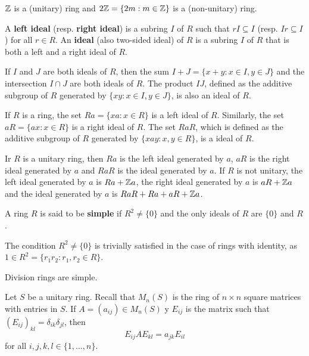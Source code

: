 \begin{example}
    $\mathbb{Z}$ is a (unitary) ring and 
	$2\mathbb{Z}=\{2m:m\in\mathbb{Z}\}$ is a (non-unitary) ring.  
\end{example}

A \textbf{left ideal} (resp. \textbf{right ideal}) is a subring $I$ of $R$ such that 
$rI\subseteq I$ (resp. $Ir\subseteq I$) for all $r\in R$. An \textbf{ideal}
(also two-sided ideal) of $R$ is a subring $I$ of $R$ that is both a left and a right ideal of $R$.

\begin{example}
	If $I$ and $J$ are both ideals of $R$, then the sum $I+J=\{x+y:x\in I,y\in J\}$ and
	the intersection $I\cap J$ are both ideals of $R$. The product $IJ$, defined as the additive
	subgroup of $R$ generated by $\{xy:x\in I,y\in J\}$, is also an ideal of $R$. 
\end{example}

\begin{example}
	If $R$ is a ring, the set $Ra =\{xa: x\in R\}$ is a left ideal
	of $R$. Similarly, the set $aR =\{ax: x\in R\}$ is a right ideal of $R$. The set $RaR$, which is
	defined as the additive subgroup of $R$ generated by $\{xay: x, y\in R\}$, is a
	ideal of $R$.
\end{example}

\begin{example}
	Ir $R$ is a unitary ring, then $Ra$ is the left ideal generated by $a$, $aR$ is
	the right ideal generated by $a$ and $RaR$ is the ideal generated by $a$. 
	If $R$ is not unitary, the left ideal generated by $a$ is $Ra+\mathbb{Z} a$,
	the right ideal generated by $a$ is $aR+\mathbb{Z} a$ and the ideal generated by 
	$a$ is $RaR+Ra+aR+\mathbb{Z} a$.
\end{example}

\begin{definition}
A ring $R$ is said to be \textbf{simple} if $R^2\ne\{0\}$ and the only ideals of 
$R$ are $\{0\}$ and $R$.  
\end{definition}

The condition $R^2\ne\{0\}$ is trivially satisfied in the case of rings
with identity, as $1\in R^2=\{r_1r_2:r_1,r_2\in R\}$.

\begin{example}
	Division rings are simple.
\end{example}

Let $S$ be a unitary ring. Recall that $M_n(S)$ is the ring of $n\times n$ square matrices 
with entries in $S$.  If $A=(a_{ij})\in M_n(S)$ y $E_{ij}$ is the matrix
such that $(E_{ij})_{kl}=\delta_{ik}\delta_{jl}$, then
\begin{equation}
	\label{eq:trick}
E_{ij}AE_{kl}=a_{jk}E_{il}
\end{equation}
for all $i,j,k,l\in\{1,\dots,n\}$. 

